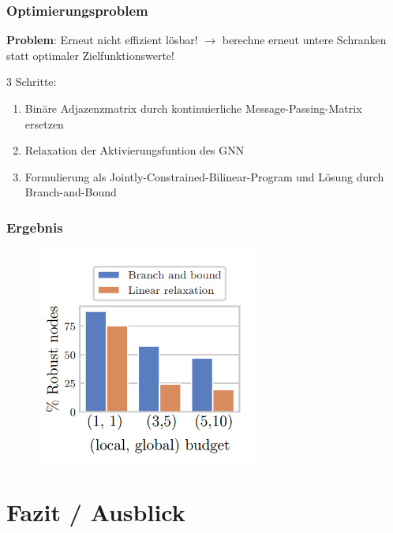 \documentclass{beamer}
\begin{document}
\begin{frame}
  \frametitle{Optimierungsproblem}
  \textbf{Problem}: Erneut nicht effizient lösbar!\newline
  $\rightarrow$ berechne erneut untere Schranken statt optimaler Zielfunktionswerte!\newline

  $3$ Schritte:
  \begin{enumerate}
    \item Binäre Adjazenzmatrix durch kontinuierliche Message-Passing-Matrix ersetzen
    \item Relaxation der Aktivierungsfuntion des GNN
    \item Formulierung als Jointly-Constrained-Bilinear-Program und Lösung durch Branch-and-Bound
  \end{enumerate}
\end{frame}

\begin{frame}
  \frametitle{Ergebnis}
  \begin{figure}
    \centering
    \includegraphics[width=0.65\textwidth]{img/graph_struct_pert_res.png}
    \caption*{ \cite{}}
  \end{figure}
\end{frame}

\section{Fazit / Ausblick}
\end{document}
